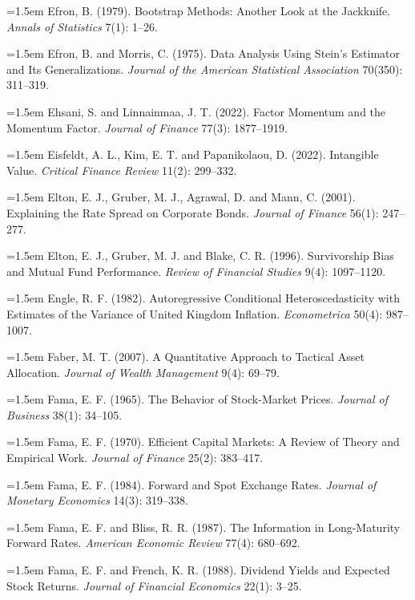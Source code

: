 \hangindent=1.5em Efron, B. (1979). Bootstrap Methods: Another Look at the Jackknife. \emph{Annals of Statistics} 7(1): 1--26.

\hangindent=1.5em Efron, B. and Morris, C. (1975). Data Analysis Using Stein's Estimator and Its Generalizations. \emph{Journal of the American Statistical Association} 70(350): 311--319.

\hangindent=1.5em Ehsani, S. and Linnainmaa, J. T. (2022). Factor Momentum and the Momentum Factor. \emph{Journal of Finance} 77(3): 1877--1919.

\hangindent=1.5em Eisfeldt, A. L., Kim, E. T. and Papanikolaou, D. (2022). Intangible Value. \emph{Critical Finance Review} 11(2): 299--332.

\hangindent=1.5em Elton, E. J., Gruber, M. J., Agrawal, D. and Mann, C. (2001). Explaining the Rate Spread on Corporate Bonds. \emph{Journal of Finance} 56(1): 247--277.

\hangindent=1.5em Elton, E. J., Gruber, M. J. and Blake, C. R. (1996). Survivorship Bias and Mutual Fund Performance. \emph{Review of Financial Studies} 9(4): 1097--1120.

\hangindent=1.5em Engle, R. F. (1982). Autoregressive Conditional Heteroscedasticity with Estimates of the Variance of United Kingdom Inflation. \emph{Econometrica} 50(4): 987--1007.

\hangindent=1.5em Faber, M. T. (2007). A Quantitative Approach to Tactical Asset Allocation. \emph{Journal of Wealth Management} 9(4): 69--79.

\hangindent=1.5em Fama, E. F. (1965). The Behavior of Stock-Market Prices. \emph{Journal of Business} 38(1): 34--105.

\hangindent=1.5em Fama, E. F. (1970). Efficient Capital Markets: A Review of Theory and Empirical Work. \emph{Journal of Finance} 25(2): 383--417.

\hangindent=1.5em Fama, E. F. (1984). Forward and Spot Exchange Rates. \emph{Journal of Monetary Economics} 14(3): 319--338.

\hangindent=1.5em Fama, E. F. and Bliss, R. R. (1987). The Information in Long-Maturity Forward Rates. \emph{American Economic Review} 77(4): 680--692.

\hangindent=1.5em Fama, E. F. and French, K. R. (1988). Dividend Yields and Expected Stock Returns. \emph{Journal of Financial Economics} 22(1): 3--25.

